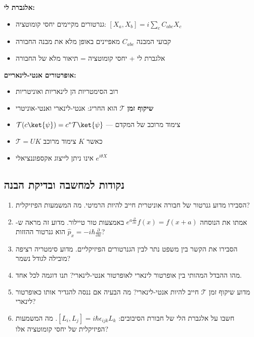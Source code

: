 \begin{summarybox}
\textbf{אלגברת לי:}
\begin{itemize}
    \item גנרטורים מקיימים יחסי קומוטציה: $[X_a, X_b] = i\sum_c C_{abc} X_c$
    \item קבועי המבנה $C_{abc}$ מאפיינים באופן מלא את מבנה החבורה
    \item אלגברת לי + יחסי קומוטציה = תיאור מלא של החבורה
\end{itemize}

\textbf{אופרטורים אנטי-לינאריים:}
\begin{itemize}
    \item רוב הסימטריות הן לינאריות ואוניטריות
    \item \textbf{שיקוף זמן} $\mathcal{T}$ הוא החריג: אנטי-לינארי ואנטי-אוניטרי
    \item $\mathcal{T}(c\ket{\psi}) = c^* \mathcal{T}\ket{\psi}$ — צימוד מרוכב של המקדם
    \item $\mathcal{T} = UK$ כאשר $K$ צימוד מרוכב
    \item אינו ניתן לייצוג אקספוננציאלי $e^{i\theta X}$
\end{itemize}
\end{summarybox}

\subsection*{נקודות למחשבה ובדיקת הבנה}

\begin{enumerate}
    \item הסבירו מדוע גנרטור של חבורה אוניטרית חייב להיות הרמיטי. מה המשמעות הפיזיקלית?
    
    \item אמתו את הנוסחה $e^{a\frac{\partial}{\partial x}}f(x) = f(x+a)$ באמצעות טור טיילור. מדוע זה מראה ש-$\hat{p}_x = -i\hbar\frac{\partial}{\partial x}$ הוא גנרטור ההזזות?
    
    \item הסבירו את הקשר בין משפט נתר לבין הגנרטורים הפיזיקליים. מדוע סימטריה רציפה מובילה לגודל נשמר?
    
    \item מהו ההבדל המהותי בין אופרטור לינארי לאופרטור אנטי-לינארי? תנו דוגמה לכל אחד.
    
    \item מדוע שיקוף זמן $\mathcal{T}$ חייב להיות אנטי-לינארי? מה הבעיה אם ננסה להגדיר אותו כאופרטור לינארי?
    
    \item חשבו על אלגברת הלי של חבורת הסיבובים: $[L_i, L_j] = i\hbar\epsilon_{ijk}L_k$. מה המשמעות הפיזיקלית של יחסי קומוטציה אלו?
\end{enumerate}
